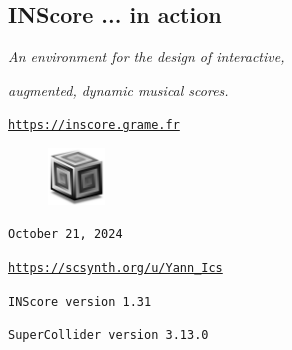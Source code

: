 \documentclass{article}
\newcommand{\icon}[1]{\texttt{[image: \#1]}}
\begin{document}
\begin{center}
\section*{\huge\sffamily INScore ... in action}
\vspace{-0.3cm}
\textsl{An environment for the design of interactive,}

\textsl{augmented, dynamic musical scores.}

\href{https://inscore.grame.fr}{\texttt{\small https://inscore.grame.fr}}

\vspace{0.3cm} 

\begin{figure}[htbp]
\begin{center}
\includegraphics[width=1.5cm]{sc}
\end{center}
\end{figure}
\texttt{October 21, 2024}

\href{https://scsynth.org/u/Yann\_Ics}{\texttt{\small https://scsynth.org/u/Yann\_Ics}}

\end{center}
\vspace{0.2cm}


\begin{center}
\texttt{\footnotesize INScore version 1.31}
 
 \vspace{-0.1cm}
\texttt{\footnotesize SuperCollider version 3.13.0}
\end{center}

\vspace{0.7cm}
\end{document}
